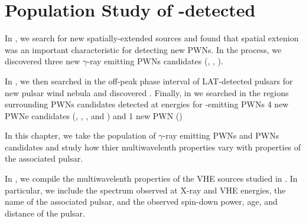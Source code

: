 \chapter{Population Study of -detected }



In , we search for new spatially-extended \fermi
sources and found that spatial extenion was an important characteristic
for detecting new \acp{PWN}. In the process, we discovered three
new $\gamma$-ray emitting \acp{PWN} candidates
(, , ).

In , we then
searched in the off-peak phase interval of \ac{LAT}-detected pulsars
for new pulsar wind nebula and discovered \threecfiftyeight.  Finally,
in  we searched in the regions surrounding \acp{PWN}
candidates detected at \tev energies for \gev-emitting \acp{PWN}
4 new PWNe candidates (, , ,
and ) and 1 new PWN ()

In this chapter, we take the population of $\gamma$-ray emitting \acp{PWN}
and \acp{PWN} candidates and study how thier multiwavelenth properties
vary with properties of the associated pulsar.




In , we compile the multiwavelenth
properties of the \ac{VHE} sources studied in . In
particular, we include the spectrum observed at X-ray and \ac{VHE}
energies, the name of the associated pulsar, and the observed spin-down
power, age, and distance of the pulsar.



